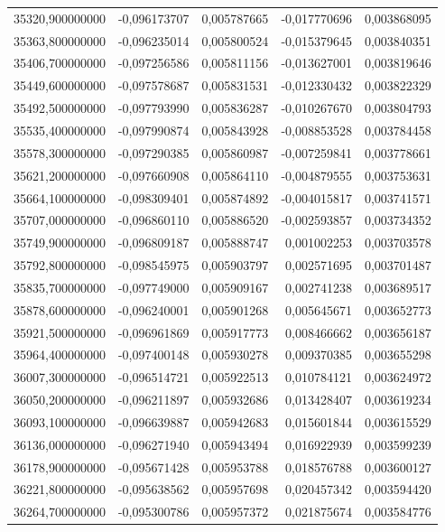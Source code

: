 \begin{longtable}{rrrrr}
35320,900000000 & -0,096173707 & 0,005787665 & -0,017770696 & 0,003868095\\
35363,800000000 & -0,096235014 & 0,005800524 & -0,015379645 & 0,003840351\\
35406,700000000 & -0,097256586 & 0,005811156 & -0,013627001 & 0,003819646\\
35449,600000000 & -0,097578687 & 0,005831531 & -0,012330432 & 0,003822329\\
35492,500000000 & -0,097793990 & 0,005836287 & -0,010267670 & 0,003804793\\
35535,400000000 & -0,097990874 & 0,005843928 & -0,008853528 & 0,003784458\\
35578,300000000 & -0,097290385 & 0,005860987 & -0,007259841 & 0,003778661\\
35621,200000000 & -0,097660908 & 0,005864110 & -0,004879555 & 0,003753631\\
35664,100000000 & -0,098309401 & 0,005874892 & -0,004015817 & 0,003741571\\
35707,000000000 & -0,096860110 & 0,005886520 & -0,002593857 & 0,003734352\\
35749,900000000 & -0,096809187 & 0,005888747 & 0,001002253 & 0,003703578\\
35792,800000000 & -0,098545975 & 0,005903797 & 0,002571695 & 0,003701487\\
35835,700000000 & -0,097749000 & 0,005909167 & 0,002741238 & 0,003689517\\
35878,600000000 & -0,096240001 & 0,005901268 & 0,005645671 & 0,003652773\\
35921,500000000 & -0,096961869 & 0,005917773 & 0,008466662 & 0,003656187\\
35964,400000000 & -0,097400148 & 0,005930278 & 0,009370385 & 0,003655298\\
36007,300000000 & -0,096514721 & 0,005922513 & 0,010784121 & 0,003624972\\
36050,200000000 & -0,096211897 & 0,005932686 & 0,013428407 & 0,003619234\\
36093,100000000 & -0,096639887 & 0,005942683 & 0,015601844 & 0,003615529\\
36136,000000000 & -0,096271940 & 0,005943494 & 0,016922939 & 0,003599239\\
36178,900000000 & -0,095671428 & 0,005953788 & 0,018576788 & 0,003600127\\
36221,800000000 & -0,095638562 & 0,005957698 & 0,020457342 & 0,003594420\\
36264,700000000 & -0,095300786 & 0,005957372 & 0,021875674 & 0,003584776\\

\end{longtable}
